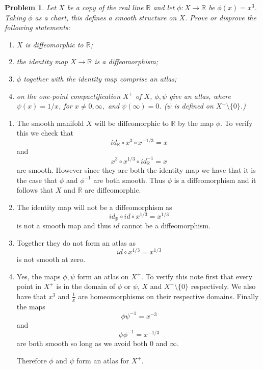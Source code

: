 \documentclass[10pt]{article}
\newcommand{\bb}[1]{\mathbb{#1}}
\theoremstyle{plain}
\newtheorem{problem}{Problem}
\theoremstyle{remark}
\begin{document}
\begin{problem}
  Let $X$ be a copy of the real line $\bb{R}$ and let $\phi:X\rightarrow\bb{R}$ be
  $\phi(x)=x^3$. Taking $\phi$ as a chart, this defines a smooth structure on
  $X$. Prove or disprove the following statements:
  \begin{enumerate}
  \item $X$ is diffeomorphic to $\bb{R}$;
  \item the identity map $X\rightarrow\bb{R}$ is a diffeomorphism;
  \item $\phi$ together with the identity map comprise an atlas;
  \item on the one-point compactification $X^+$ of $X$, $\phi,\psi$ give an
    atlas, where $\psi(x)=1/x$, for $x\neq 0,\infty,$ and $\psi(\infty)=0$. ($\psi$ is defined
    on $X^+\setminus\{0\}$.)
  \end{enumerate}
\end{problem}

\begin{enumerate}
\item The smooth manifold $X$ will be diffeomorphic to $\bb{R}$ by the map
  $\phi$. To verify this we check that
  \[ id_{\bb{R}}\circ x^3\circ x^{-1/3}=x\]
  and
  \[ x^3\circ x^{1/3}\circ id_{\bb{R}}^{-1}=x\]
  are smooth. However since they are both the identity map we have that it is
  the case that $\phi$ and $\phi^{-1}$ are both smooth. Thus $\phi$ is a diffeomorphism
  and it follows that $X$ and $\bb{R}$ are diffeomorphic.
  
\item The identity map will not be a diffeomorphism as
  \[ id_{\bb{R}}\circ id\circ x^{1/3}=x^{1/3}\]
  is not a smooth map and thus $id$ cannot be a diffeomorphism.
  
\item Together they do not form an atlas as
  \[ id\circ x^{1/3}=x^{1/3}\]
  is not smooth at zero.
  
\item Yes, the maps $\phi,\psi$ form an atlas on $X^+$. To verify this note
  first that every point in $X^+$ is in the domain of $\phi$ or $\psi$,
  $X$ and $X^+\setminus\{0\}$ respectively. We also have that $x^3$ and $\frac{1}{x}$ are
  homeomorphisms on their respective domains. Finally the maps
  \[ \phi\psi^{-1}=x^{-3}\]
  and
  \[ \psi\phi^{-1}=x^{-1/3}\]
  are both smooth so long as we avoid both $0$ and $\infty$.

  Therefore $\phi$ and $\psi$ form an atlas for $X^+$.
\end{enumerate}

\end{document}
